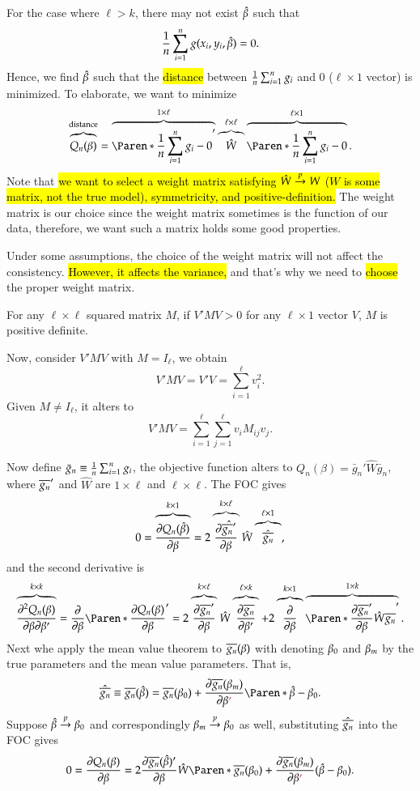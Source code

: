 \documentclass{Theme}
\begin{document}
For the case where $\ell>k$, there may not exist $\hat{\beta}$ such that 
\[
  \frac{1}{n}\sum_{i=1}^n g(x_i,y_i,\hat{\beta})=0.
\]
Hence, we find $\hat{\beta}$ such that the \hl{distance} between $\frac{1}{n}\sum_{i=1}^n  g_i$ and $0$ ($\ell\times1$ vector) is 
minimized. To elaborate, we want to minimize 
\[
  \overbrace{Q_n(\be)}^{\mathrm{distance}}=\overbrace{\br{\frn\sumn g_i-0}'}^{1\times \ell}\overbrace{\hat{W}}^{\ell\times \ell}\overbrace{\br{\frn\sumn g_i-0}}^{\ell\times 1}.
\]
Note that \hl{we want to select a weight matrix satisfying $\hat{W}\stackrel{p}{\to} W$ ($W$ is some matrix, not the true model), 
symmetricity, and positive-definition.}
The weight matrix is our choice since the weight matrix sometimes is the function of our data, therefore, we want such a matrix
holds some good properties.
\begin{remark}
Under some assumptions, the choice of the weight matrix will not affect the consistency.
  \hl{However, it affects the variance,} and that's why we need to \hl{choose} the proper weight matrix.
\end{remark}
\begin{remark}
For any $\ell\times \ell$ squared matrix $M$, if $V'MV >0$ for any $\ell\times1$ vector $V$,
$M$ is positive definite.

Now, consider $V'MV$ with $M=I_\ell$, we obtain 
  \[
    V'MV = V'V =  \sum_{i=1}^\ell v_i^2.
  \]
Given $M\neq I_\ell$, it alters to 
  \[
    V'MV = \sum_{i=1}^\ell\sum_{j=1}^\ell v_iM_{ij}v_j.
  \]
\end{remark}
Now define $\bar{g}_n\equiv\frac{1}{n}\sum_{i=1}^n g_i$, the objective function alters to 
$Q_n(\beta)=\bar{g}_n'\hat{W}\bar{g}_n$, where $\overline{g_n}'$ and  $\hat{W}$
are $1\times\ell$ and $\ell\times\ell$. The FOC gives 
\[
  0=\overbrace{\frac{\partial Q_n(\hat{\beta})}{\partial \beta}}^{k\times 1} = 2\overbrace{\frac{\partial \hat{\overline{g_n}'}}{\partial \beta}}^{k\times\ell}\hat{W}\overbrace{\hat{\overline{g_n}}}^{\ell\times1},
\]
and the second derivative is 
\[
  \overbrace{\ppdv{Q_n(\be)}{\be}{\be'}}^{k\times k}=
  \pdv{}{\be}\br{\pdv{Q_n(\be)}{\be}}'
  =2\overbrace{\pdv{\bgn'}{\be}}^{k\times\ell}\hat{W}\overbrace{\pdv{\bgn}{\be'}}^{\ell\times k}
  +2\overbrace{\pdv{}{\be}}^{k\times1}\overbrace{\br{\pdv{\bgn'}{\be}\hat{W}\bgn}'}^{1\times k}.
\]
Next whe apply the mean value theorem to $\overline{g_n}(\beta)$ with denoting $\beta_0$ and $\beta_m$ by 
the true parameters and the mean value parameters. That is, 
\[
  \hat{\bgn}\equiv\bgn(\hb)=\bgn(\be_0)+\pdv{\bgn(\be_m)}{\be\hl{'}}\br{\hb-\be_0}.
\]
Suppose $\hat{\beta}\stackrel{p}{\to}\beta_0$ and correspondingly $\beta_m\stackrel{p}{\to} \beta_0$ as well, substituting $\hat{\overline{g_n}}$ into the FOC gives 
\[
  0=\pdv{Q_n(\be)}{\be}=2\pdv{\bgn(\hb)'}{\be}\hat{W}\br{\bgn(\be_0)+\pdv{\bgn(\be_m)}{\be\hl{'}}(\hb-\be_0)}.
\]
\end{document}
